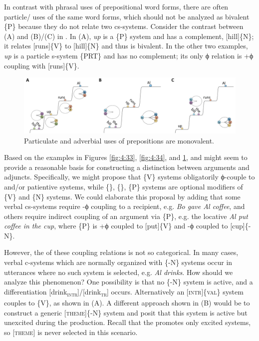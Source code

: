   In contrast with phrasal uses of prepositional word forms, there are often particle/ uses of the same word forms, which should not be analyzed as bivalent \{P\} because they do not relate two cs-systems. Consider the contrast between (A) and (B)/(C) in {}. In (A), \textit{up} is a \{P\} system and has a complement, [hill]\{N\}; it relates [runs]\{V\} to [hill]\{N\} and thus is bivalent. In the other two examples, \textit{up} is a particle s-system \{PRT\} and has no complement; its only ϕ relation is +ϕ coupling with [runs]\{V\}.

  
\begin{figure}
\includegraphics[width=\textwidth]{figures/Tilsen-img85.png}
\caption{Particulate and adverbial uses of prepositions are monovalent.}
\label{fig:4:35}
\end{figure}
 

  Based on the examples in Figures {\ref{fig:4:33}}, {\ref{fig:4:34}}, and {\ref{fig:4:35}},  and  might seem to provide a reasonable basis for constructing a distinction between arguments and adjuncts. Specifically, we might propose that \{V\} systems obligatorily ϕ-couple to  and/or patientive systems, while \{\}, \{\}, \{P\} systems are optional modifiers of \{V\} and \{N\} systems. We could elaborate this proposal by adding that some verbal cs-systems require -ϕ coupling to a recipient, e.g. \textit{Bo gave Al coffee}, and others require indirect coupling of an argument via \{P\}, e.g. the locative \textit{Al put coffee in the cup}, where \{P\} is +ϕ coupled to [put]\{V\} and -ϕ coupled to [cup]\{-N\}.

  However, the  of these coupling relations is not so categorical. In many cases, verbal c-systems which are normally organized with \{-N\} systems occur in utterances where no such system is selected, e.g. \textit{Al drinks}. How should we analyze this phenomenon? One possibility is that no \{-N\} system is active, and a differentiation [drink\textsc{\textsubscript{intr}}]/[drink\textsc{\textsubscript{tr}}] occurs. Alternatively an [\textsc{intr}]\{\textsc{val}\} system couples to \{V\}, as shown in {}(A). A different approach shown in (B) would be to construct a generic [\textsc{theme}]\{-N\} system and posit that this system is active but unexcited during the production. Recall that the  promotes only excited systems, so [\textsc{theme}] is never selected in this scenario. 

